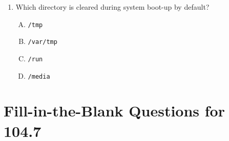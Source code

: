 \documentclass[a4paper]{report}
\begin{document}
\begin{enumerate}[1.]
    \item Which directory is cleared during system boot-up by default?  
    \begin{enumerate}[A)]
        \item \texttt{/tmp}  
        \item \texttt{/var/tmp}  
        \item \texttt{/run}  
        \item \texttt{/media}  
    \end{enumerate}

\end{enumerate}

\newpage
\section*{Fill-in-the-Blank Questions for 104.7}
\end{document}
